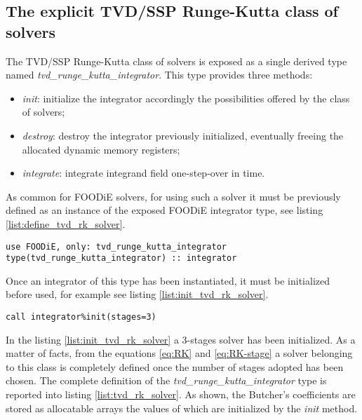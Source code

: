 \documentclass[pdftex,preprint,3p,times,numbers]{elsarticle}
\begin{document}
\subsection{The explicit TVD/SSP Runge-Kutta class of solvers}\label{subsec:solver_tvd_rk}

The TVD/SSP Runge-Kutta class of solvers is exposed as a single derived type named \emph{tvd\_runge\_kutta\_integrator}. This type provides three methods:

\begin{itemize}
  \item \emph{init}: initialize the integrator accordingly the possibilities offered by the class of solvers;
  \item \emph{destroy}: destroy the integrator previously initialized, eventually freeing the allocated dynamic memory registers;
  \item \emph{integrate}: integrate integrand field one-step-over in time.
  \end{itemize}

As common for FOODiE solvers, for using such a solver it must be previously defined as an instance of the exposed FOODiE integrator type, see listing \ref{list:define_tvd_rk_solver}.

\begin{lstlisting}[firstnumber=1,style=code,caption={definition of an explicit TVD/SSP Runge-Kutta integrator},label={list:define_tvd_rk_solver}]
use FOODiE, only: tvd_runge_kutta_integrator
type(tvd_runge_kutta_integrator) :: integrator
\end{lstlisting}

Once an integrator of this type has been instantiated, it must be initialized before used, for example see listing \ref{list:init_tvd_rk_solver}.

\begin{lstlisting}[firstnumber=1,style=code,caption={example of initialization of an explicit TVD/SSP Runge-Kutta integrator},label={list:init_tvd_rk_solver}]
call integrator%init(stages=3)
\end{lstlisting}

In the listing \ref{list:init_tvd_rk_solver} a 3-stages solver has been initialized. As a matter of facts, from the equations \ref{eq:RK} and \ref{eq:RK-stage} a solver belonging to this class is completely defined once the number of stages adopted has been chosen. The complete definition of the \emph{tvd\_runge\_kutta\_integrator} type is reported into listing \ref{list:tvd_rk_solver}. As shown, the Butcher's coefficients are stored as allocatable arrays the values of which are initialized by the \emph{init} method.
\end{document}
